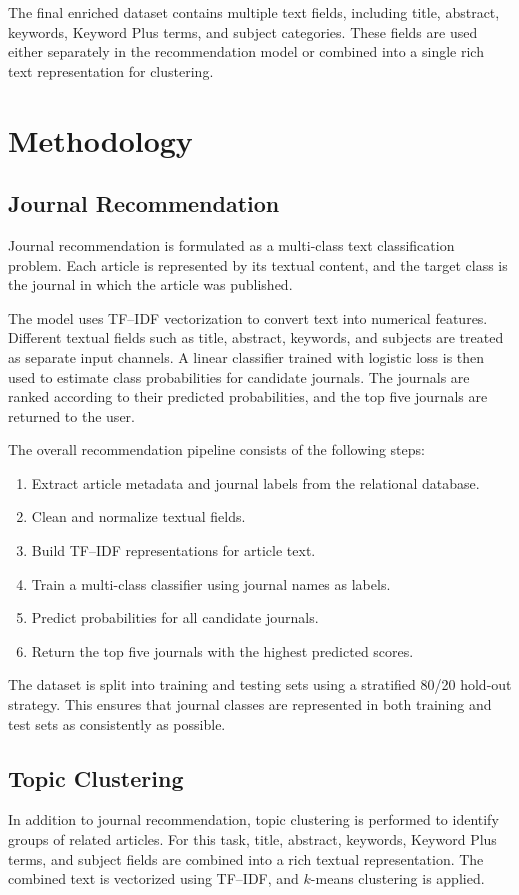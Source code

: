 \documentclass[conference]{IEEEtran}
\begin{document}
The final enriched dataset contains multiple text fields, including title, abstract, keywords, Keyword Plus terms, and subject categories. These fields are used either separately in the recommendation model or combined into a single rich text representation for clustering.

\section{Methodology}

\subsection{Journal Recommendation}
Journal recommendation is formulated as a multi-class text classification problem. Each article is represented by its textual content, and the target class is the journal in which the article was published.

The model uses TF--IDF vectorization to convert text into numerical features. Different textual fields such as title, abstract, keywords, and subjects are treated as separate input channels. A linear classifier trained with logistic loss is then used to estimate class probabilities for candidate journals. The journals are ranked according to their predicted probabilities, and the top five journals are returned to the user.

The overall recommendation pipeline consists of the following steps:

\begin{enumerate}
    \item Extract article metadata and journal labels from the relational database.
    \item Clean and normalize textual fields.
    \item Build TF--IDF representations for article text.
    \item Train a multi-class classifier using journal names as labels.
    \item Predict probabilities for all candidate journals.
    \item Return the top five journals with the highest predicted scores.
\end{enumerate}

The dataset is split into training and testing sets using a stratified 80/20 hold-out strategy. This ensures that journal classes are represented in both training and test sets as consistently as possible.

\subsection{Topic Clustering}
In addition to journal recommendation, topic clustering is performed to identify groups of related articles. For this task, title, abstract, keywords, Keyword Plus terms, and subject fields are combined into a rich textual representation. The combined text is vectorized using TF--IDF, and $k$-means clustering is applied.
\end{document}
